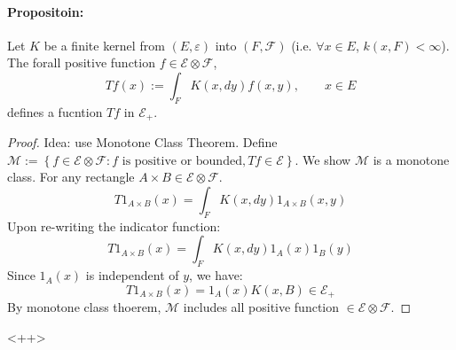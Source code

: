 \documentclass[11pt]{article}
\newcommand{\m}{\mathcal}
\renewcommand{\epsilon}{\varepsilon}
\begin{document}
    \paragraph{Propositoin:} 
    \label{prop:Tf}
    Let $K$ be a finite kernel from $(E, \epsilon)$
    into $(F, \m F)$ (i.e. $\forall x \in E$, $k(x, F) < \infty$). The forall
    positive function $f \in \m E \otimes \m F$, 
    \[
      Tf(x):= \int_F K(x, dy) f(x,y), \qquad x \in E
    \]
    defines a fucntion $Tf$ in $\m E_+$. 

    \begin{proof}
      Idea: use Monotone Class Theorem. Define $\m M := \left\{ f \in \m E
        \otimes \m F: f \text{ is positive or bounded}, Tf \in \m E \right\}$. 
        We show $\m M$ is a monotone class. For any rectangle $A\times B \in \m
        E \otimes \m F$. 
        \[
          T 1 _{A \times B } (x)  = \int _F K(x, dy) 1 _{A\times B} (x,y)
        \]
        Upon re-writing the indicator function: 
        \[
          T 1 _{A \times B } (x)  = \int _F K(x, dy) 1 _{A} (x) 1_{B}(y)
        \]
        Since $1_A(x)$ is independent of $y$, we have: 
        \[
          T 1_{A\times B}(x) = 1_A(x) K(x, B) \in \m E_+
        \]
        By monotone class thoerem, $\m M$ includes all positive function $\in \m
        E \otimes \m F$. 

    \end{proof}<++>
\end{document}
